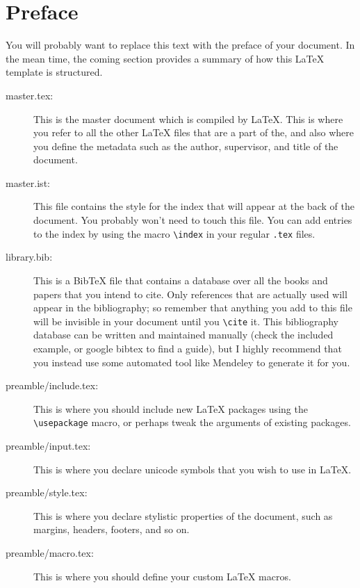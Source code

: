 \chapter*{Preface}
You will probably want to replace this text with the preface of your document.
In the mean time, the coming section provides a summary of how this LaTeX template is structured.
\begin{description}
\item[master.tex:]
	This is the master document which is compiled by LaTeX. This is where you refer to all the other LaTeX files that are a part of the, and also where you define the metadata such as the author, supervisor, and title of the document.

\item[master.ist:]
	This file contains the style for the index that will appear at the back
	of the document. You probably won't need to touch this file. You can add
	entries to the index by using the macro \texttt{\textbackslash index} in your regular \texttt{.tex}
	files.

\item[library.bib:]
	This is a BibTeX file that contains a database over all the books and
	papers that you intend to cite. Only references that are actually used will
	appear in the bibliography; so remember that anything you add to this file
	will be invisible in your document until you \texttt{\textbackslash cite} it. This bibliography
	database can be written and maintained manually (check the included example,
	or google bibtex to find a guide), but I highly recommend that you instead
	use some automated tool like Mendeley to generate it for you.

\item[preamble/include.tex:]
	This is where you should include new LaTeX packages using the \texttt{\textbackslash usepackage} macro, or perhaps tweak the arguments of existing packages.

\item[preamble/input.tex:]
	This is where you declare unicode symbols that you wish to use in LaTeX.

\item[preamble/style.tex:]
	This is where you declare stylistic properties of the document, such as margins,
	headers, footers, and so on.

\item[preamble/macro.tex:]
	This is where you should define your custom LaTeX macros.


\end{description}
